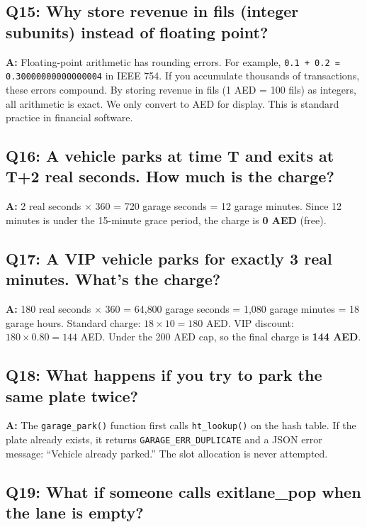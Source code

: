 \documentclass[12pt, a4paper]{article}
\begin{document}
\subsection{Q15: Why store revenue in fils (integer subunits) instead of floating point?}

\textbf{A:} Floating-point arithmetic has rounding errors. For example, \texttt{0.1 + 0.2 = 0.30000000000000004} in IEEE 754. If you accumulate thousands of transactions, these errors compound. By storing revenue in fils (1 AED = 100 fils) as integers, all arithmetic is exact. We only convert to AED for display. This is standard practice in financial software.

\subsection{Q16: A vehicle parks at time T and exits at T+2 real seconds. How much is the charge?}

\textbf{A:} 2 real seconds $\times$ 360 = 720 garage seconds = 12 garage minutes. Since 12 minutes is under the 15-minute grace period, the charge is \textbf{0 AED} (free).

\subsection{Q17: A VIP vehicle parks for exactly 3 real minutes. What's the charge?}

\textbf{A:} 180 real seconds $\times$ 360 = 64{,}800 garage seconds = 1{,}080 garage minutes = 18 garage hours. Standard charge: $18 \times 10 = 180$ AED. VIP discount: $180 \times 0.80 = 144$ AED. Under the 200 AED cap, so the final charge is \textbf{144 AED}.

\subsection{Q18: What happens if you try to park the same plate twice?}

\textbf{A:} The \texttt{garage\_park()} function first calls \texttt{ht\_lookup()} on the hash table. If the plate already exists, it returns \texttt{GARAGE\_ERR\_DUPLICATE} and a JSON error message: ``Vehicle already parked.'' The slot allocation is never attempted.

\subsection{Q19: What if someone calls exitlane\_pop when the lane is empty?}
\end{document}
